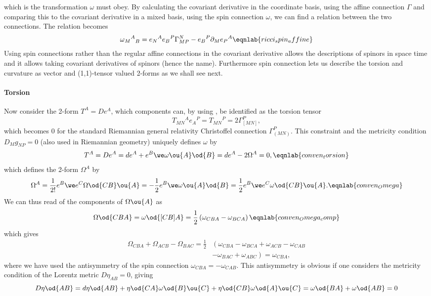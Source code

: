which is the transformation $\omega$ must obey.
By calculating the covariant derivative in the coordinate basis, using the affine connection $\Gamma$ and comparing this to the covariant derivative in a mixed basis, using the spin connection $\omega$, we can find a relation between the two connections\cite{carroll}. 
The relation becomes
\begin{align}
\omega{{_M}^A}_B = e{_N}^A e{_B}^P\Gamma^N_{MP} - e{_B}^P\partial_M e{_P}^A
\eqnlab{ricci_spin_affine}
\end{align}
Using spin connections rather than the regular affine connections in the covariant derivative allows the descriptions of spinors in space time and it allows taking covariant derivatives of spinors (hence the name). Furthermore spin connection lets us describe the torsion and curvature as vector and (1,1)-tensor valued 2-forms as we shall see next.    
%
\paragraph{Torsion}
Now consider the 2-form $T^A = De^A$, which components can, by using , be identified as the torsion tensor
\begin{equation}
T{_{MN}}^Ae{_A}^P = T{_{MN}}^P = 2\Gamma^P_{[MN]},
\end{equation}
which becomes 0 for the standard Riemannian general relativity Christoffel connection $\Gamma^P_{(MN)}$. 
This constraint and the metricity condition $D_Mg_{NP}=0$ (also used in Riemannian geometry) uniquely defines $\omega$ by
\begin{equation}
T^A = De^A = de^A + e^B\we\omega\ou{A}\od{B} = de^A - 2\Omega^A = 0, 
\eqnlab{conven_torsion}
\end{equation}
which defines the 2-form $\Omega^A$ by
\begin{equation}
\Omega^A = \frac{1}{2!}e^B\we e^C\Omega\od{CB}\ou{A} = -\frac{1}{2}e^B\we\omega\ou{A}\od{B} = \frac{1}{2}e^B\we e^C\omega\od{CB}\ou{A}.
\eqnlab{conven_Omega}
\end{equation}
We can thus read of the components of $\Omega\ou{A}$ as
\begin{equation} 
\Omega\od{CBA} = \omega\od{[CB]A} = \frac{1}{2}\left(\omega_{CBA}-\omega_{BCA}\right)
\eqnlab{conven_Omega_comp}
\end{equation}
which gives
\begin{align}
\Omega{_{CBA}}+\Omega{_{ACB}}-\Omega{_{BAC}} = \frac{1}{2}&\left( \omega_{CBA}-\omega_{BCA} + \omega_{ACB}-\omega_{CAB}\right.\nonumber\\ 
&\left.- \omega_{BAC}+\omega_{ABC} \right)= \omega_{CBA},
\end{align}
where we have used the antisymmetry of the spin connection $\omega_{CBA}=-\omega_{CAB}$.
This antisymmetry is obvious if one considers the metricity condition of the Lorentz metric $D\eta_{AB}=0$, giving 
\begin{equation}
D\eta\od{AB} = d\eta\od{AB} + \eta\od{CA}\omega\od{B}\ou{C} + \eta\od{CB}\omega\od{A}\ou{C} = \omega\od{BA} + \omega\od{AB} = 0 
\end{equation}

